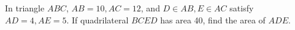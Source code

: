 In triangle $ABC$, $AB=10,AC=12$, and $D\in AB,E\in AC$ satisfy $AD=4,AE=5$. If quadrilateral $BCED$ has area 40, find the area of $ADE$.
